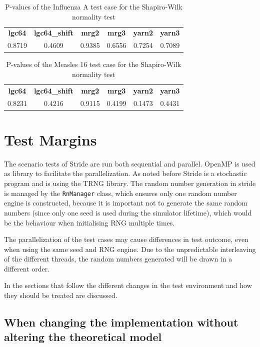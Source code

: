 \documentclass[natbib=true]{acmart}
\begin{document}
\begin{table}[!hbt]
    \begin{tabular}{c c c c c c}
       \textbf{lgc64} & \textbf{lgc64\_shift} & \textbf{mrg2} & \textbf{mrg3} & \textbf{yarn2} & \textbf{yarn3}\\
        0.8719 & 0.4609 & 0.9385 & 0.6556 & 0.7254 & 0.7089
    \end{tabular}
    \caption{P-values of the Influenza A test case for the Shapiro-Wilk normality test}
    \label{tab:influenza_a:shapiro}
\end{table}

\begin{table}[!hbt]
    \begin{tabular}{c c c c c c}
       \textbf{lgc64} & \textbf{lgc64\_shift} & \textbf{mrg2} & \textbf{mrg3} & \textbf{yarn2} & \textbf{yarn3}\\
        0.8231 & 0.4216 & 0.9115 & 0.4199 & 0.1473 & 0.4431
    \end{tabular}
    \caption{P-values of the Measles 16 test case for the Shapiro-Wilk normality test}
    \label{tab:measles_16:shapiro}
\end{table}

\FloatBarrier

\section{Test Margins}

The scenario tests of Stride are run both sequential and parallel. 
OpenMP is used as library to facilitate the parallelization. 
As noted before Stride is a stochastic program and is using the TRNG library. 
The random number generation in stride is managed by the \texttt{RnManager} class, which ensures only one random number engine is constructed, because it is important not to generate the same random numbers (since only one seed is used during the simulator lifetime), which would be the behaviour when initialising RNG multiple times.

The parallelization of the test cases may cause differences in test outcome, even when using the same seed and RNG engine. 
Due to the unpredictable interleaving of the different threads, the random numbers generated will be drawn in a different order. 

In the sections that follow the different changes in the test environment and how they should be treated are discussed.

\subsection{When changing the implementation without altering the theoretical model}
\end{document}

